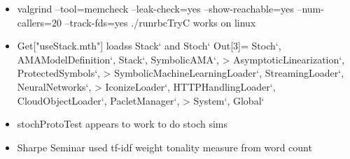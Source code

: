 \documentclass[hyperref]{labbook}
\begin{document}












\begin{itemize}
\item valgrind --tool=memcheck --leak-check=yes --show-reachable=yes --num-callers=20 --track-fds=yes ./runrbcTryC works on linux
\item Get["useStack.mth"] loadss Stack` and Stoch` 
Out[3]= {Stoch`, AMAModelDefinition`, Stack`, SymbolicAMA`, 
>    AsymptoticLinearization`, ProtectedSymbols`, 
>    SymbolicMachineLearningLoader`, StreamingLoader`, NeuralNetworks`,  
>    IconizeLoader`, HTTPHandlingLoader`, CloudObjectLoader`, PacletManager`, 
 >    System`, Global`}
\item stochProtoTest appears to work to do stoch sims

\end{itemize}








  \begin{itemize}
  \item Sharpe Seminar used tf-idf weight tonality measure from word count
  \end{itemize}
\end{document}
